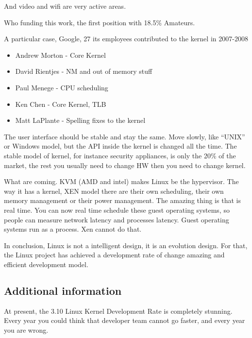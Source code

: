 \documentclass[11pt]{article}
\begin{document}
And video and wifi are very active areas.

Who funding this work, the first position with 18.5\% Amateurs.

A particular case, Google, 27 its employees contributed to the kernel in 2007-2008
\begin{itemize}
	\item Andrew Morton - Core Kernel
	\item David Rientjes - NM and out of memory stuff
	\item Paul Menege - CPU scheduling
	\item Ken Chen - Core Kernel, TLB
	\item Matt LaPlante - Spelling fixes to the kernel
\end{itemize}

The user interface should be stable and stay the same. Move slowly, like ``UNIX'' or Windows model, but the API inside the kernel is changed all the time. The stable model of kernel, for instance security appliances, is only the 20\% of the market, the rest you usually need to change HW then you need to change kernel.

What are coming.
KVM (AMD and intel) makes Linux be the hypervisor. The way it has a kernel, XEN model there are their own scheduling, their own memory management or their power management. The amazing thing is that is real time. You can now real time schedule these guest operating systems, so people can measure network latency and processes latency. Guest operating systems run as a process. Xen cannot do that.

In conclusion, Linux is not a intelligent design, it is an evolution design. For that, the Linux project has achieved a development rate of change amazing and efficient development model.

\subsection{Additional information}
At present, the 3.10 Linux Kernel Development Rate is completely stunning. Every year you could think that developer team cannot go faster, and every year you are wrong.
\end{document}
